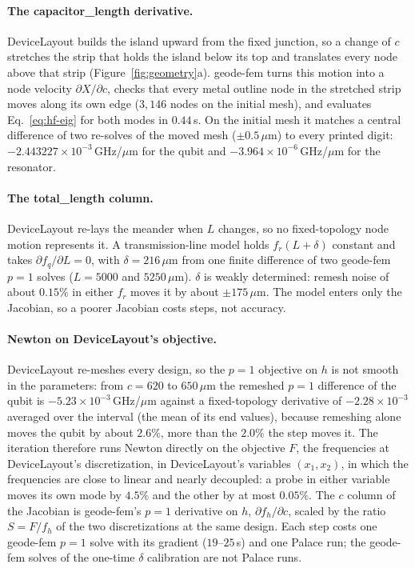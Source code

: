 \documentclass{anvil-paper}
\begin{document}
\paragraph{The capacitor\_length derivative.}
DeviceLayout builds the island upward from the fixed junction, so a change
of $c$ stretches the strip that holds the island below its top and
translates every node above that strip (Figure~\ref{fig:geometry}a).
geode-fem turns this motion into a node velocity
$\partial X/\partial c$, checks that every metal outline node in the
stretched strip moves along its own edge ($3{,}146$ nodes on the initial
mesh), and evaluates Eq.~\eqref{eq:hf-eig} for both modes in $0.44$\,s.
On the initial mesh it matches a central
difference of two re-solves of the moved mesh ($\pm0.5\,\mu$m) to every
printed digit: $-2.443227\times10^{-3}$\,GHz/$\mu$m for the qubit and
$-3.964\times10^{-6}$\,GHz/$\mu$m for the resonator.

\paragraph{The total\_length column.}
DeviceLayout re-lays the meander when $L$ changes, so no fixed-topology
node motion represents it. A transmission-line model holds $f_r(L+\delta)$
constant and takes $\partial f_q/\partial L = 0$, with $\delta =
216\,\mu$m from one finite difference of two geode-fem $p = 1$ solves
($L = 5000$ and $5250\,\mu$m). $\delta$ is weakly determined: remesh noise
of about $0.15\%$ in either $f_r$ moves it by about $\pm175\,\mu$m. The
model enters only the Jacobian, so a poorer Jacobian costs steps, not
accuracy.

\paragraph{Newton on DeviceLayout's objective.}
DeviceLayout re-meshes every design, so the $p = 1$ objective on $h$ is not
smooth in the parameters: from $c = 620$ to $650\,\mu$m the remeshed
$p = 1$ difference of the qubit is $-5.23\times10^{-3}$\,GHz/$\mu$m
against a fixed-topology derivative of $-2.28\times10^{-3}$ averaged over
the interval (the mean of its end values), because remeshing alone moves
the qubit by about $2.6\%$, more than the $2.0\%$ the step moves it. The
iteration therefore runs Newton directly on the objective $F$, the
frequencies at DeviceLayout's discretization,
in DeviceLayout's variables $(x_1, x_2)$, in which the frequencies are
close to linear and nearly decoupled: a probe in either variable moves its
own mode by $4.5\%$ and the other by at most $0.05\%$. The $c$ column of
the Jacobian is geode-fem's $p = 1$ derivative on $h$, $\partial f_h/\partial c$, scaled by the
ratio $S = F/f_h$ of the two discretizations at the same design. Each step costs one geode-fem
$p = 1$ solve with its gradient ($19$--$25$\,s) and one Palace run; the
geode-fem solves of the one-time $\delta$ calibration are not Palace runs.
\end{document}
